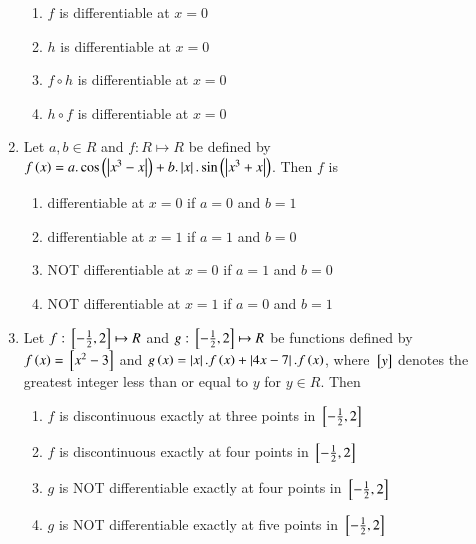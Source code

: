 \documentclass[journal,12pt]{IEEEtran}
\theoremstyle{remark}
\begin{document}
\begin{enumerate}
    \hfill 
    {}
    
    \begin{enumerate}
        
        \item $f$ is differentiable at $x=0$ 
        \item $h$ is differentiable at $x=0$ 
        \item $f\circ h$ is differentiable at $x=0$ 
        \item $h\circ f$ is differentiable at $x=0$  
    \end{enumerate}


    \item 
	    Let $a, b\in R$ and $f: R\mapsto R$ be defined by $f\left(x\right)=a.\cos \left(\left\vert x^3-x\right\vert\right) +b.\left\vert x\right\vert.\sin \left(\left\vert x^3+x\right\vert\right)$. Then $f$ is   
        
    \hfill 
    {}
    
    \begin{enumerate}

        \item differentiable at $x=0$ if $a=0$ and $b=1$
        \item differentiable at $x=1$ if $a=1$ and $b=0$
        \item {NOT} differentiable at $x=0$ if $a=1$ and $b=0$
        \item {NOT} differentiable at $x=1$ if $a=0$ and $b=1$
    \end{enumerate}


    \item 
	    Let $f:{}\left[-\frac{1}{2}, 2\right]\mapsto R$ and $g:{}\left[-\frac{1}{2}, 2\right]\mapsto R$ be functions defined by $f\left(x\right)={}\left[x^2-3\right]$ and $g\left(x\right)=\left\vert x\right\vert.f\left(x\right)+\left\vert4x-7\right\vert.f\left(x\right)$, where ${}\left[y\right]$ denotes the greatest integer less than or equal to $y$ for $y\in R$. Then   
        
    \hfill 
    {}
    
    \begin{enumerate}
        
        \item $f$ is discontinuous exactly at three points in ${}\left[-\frac{1}{2}, 2\right]$
        \item $f$ is discontinuous exactly at four points in ${}\left[-\frac{1}{2}, 2\right]$
        \item $g$ is NOT differentiable exactly at four points in ${}\left[-\frac{1}{2}, 2\right]$
        \item $g$ is NOT differentiable exactly at five points in ${}\left[-\frac{1}{2}, 2\right]$
    \end{enumerate}

\end{enumerate}
\end{document}
